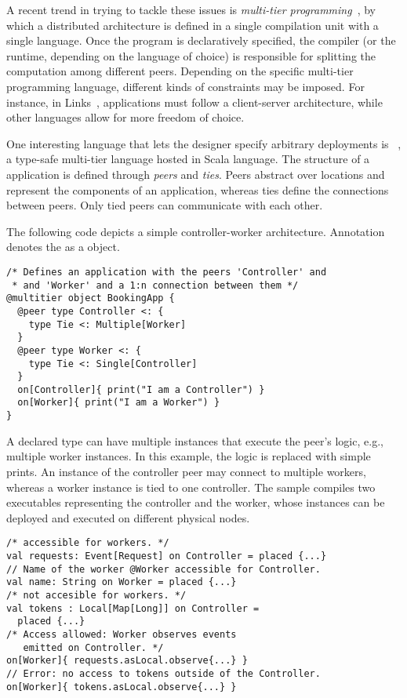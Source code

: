 A recent trend in trying to tackle these issues is 
 \emph{multi-tier programming}~\cite{DBLP:journals/csur/WeisenburgerWS20},
 by which a distributed architecture is defined in a single compilation unit with a single language.
%
Once the program is declaratively specified,
 the compiler (or the runtime, depending on the language of choice) is responsible for
 splitting the computation among different peers.
%
Depending on the specific multi-tier programming language,
 different kinds of constraints may be imposed.
%
For instance, in Links~\cite{DBLP:conf/fmco/CooperLWY06},
 applications must follow a client-server architecture,
 while other languages allow for more freedom of choice.

One interesting language that lets the designer specify arbitrary deployments is \scalaloci{}
 ~\cite{Weisenburger.2018, DBLP:conf/ecoop/WeisenburgerS19, DBLP:journals/programming/WeisenburgerS20},
 a type-safe multi-tier language hosted in Scala language.
%
The structure of a \scalaloci{} application is defined through \textit{peers} and \textit{ties}.
%
Peers abstract over locations and represent the components
 of an application,
 whereas ties define the connections between peers. 
 Only tied peers can communicate with each other.

The following code depicts a simple controller-worker architecture.
%
Annotation  denotes the  as a \scalaloci{} object. 

\begin{lstlisting}
/* Defines an application with the peers 'Controller' and 
 * and 'Worker' and a 1:n connection between them */
@multitier object BookingApp {
  @peer type Controller <: { 
    type Tie <: Multiple[Worker] 
  }
  @peer type Worker <: { 
    type Tie <: Single[Controller] 
  }
  on[Controller]{ print("I am a Controller") }
  on[Worker]{ print("I am a Worker") }
}
\end{lstlisting}
A declared  type can have multiple instances that execute the peer's logic, 
 e.g., multiple worker instances.
%
In this example, 
 the logic is replaced with simple prints.
%
An instance of the controller peer may connect to multiple workers, 
 whereas a worker instance is tied to one controller. 
%
The sample compiles two executables representing the controller and the worker, 
 whose instances can be deployed and executed on different physical nodes.
\begin{lstlisting}
/* accessible for workers. */
val requests: Event[Request] on Controller = placed {...}
// Name of the worker @Worker accessible for Controller.
val name: String on Worker = placed {...}
/* not accesible for workers. */
val tokens : Local[Map[Long]] on Controller = 
  placed {...}
/* Access allowed: Worker observes events 
   emitted on Controller. */
on[Worker]{ requests.asLocal.observe{...} }
// Error: no access to tokens outside of the Controller.
on[Worker]{ tokens.asLocal.observe{...} }
\end{lstlisting}

